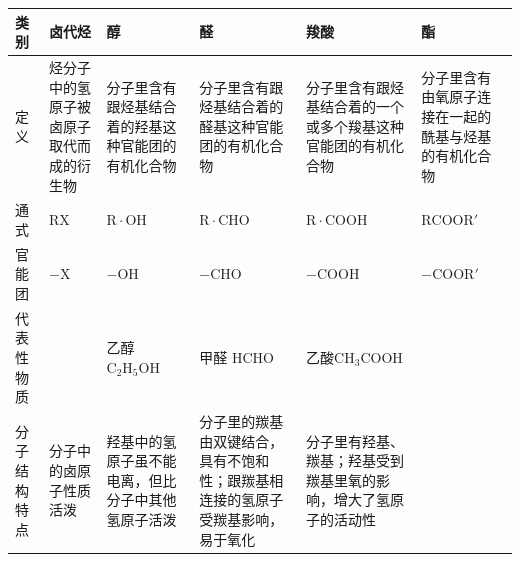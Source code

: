 {\def\LTcaptype{none}\footnotesize\setlength{\tabcolsep}{3pt}%
\begin{longtable}[]{@{}
  >{\raggedright\arraybackslash}p{}
  >{\raggedright\arraybackslash}p{}
  >{\raggedright\arraybackslash}p{}
  >{\raggedright\arraybackslash}p{}
  >{\raggedright\arraybackslash}p{}
  >{\raggedright\arraybackslash}p{}@{}}
\toprule\noalign{}
\begin{minipage}[b]{\linewidth}\raggedright
类别
\end{minipage} & \begin{minipage}[b]{\linewidth}\raggedright
卤代烃
\end{minipage} & \begin{minipage}[b]{\linewidth}\raggedright
醇
\end{minipage} & \begin{minipage}[b]{\linewidth}\raggedright
醛
\end{minipage} & \begin{minipage}[b]{\linewidth}\raggedright
羧酸
\end{minipage} & \begin{minipage}[b]{\linewidth}\raggedright
酯
\end{minipage} \\
\midrule\noalign{}
\endhead
\bottomrule\noalign{}
\endlastfoot
定义 & 烃分子中的氢原子被卤原子取代而成的衍生物 &
分子里含有跟烃基结合着的羟基这种官能团的有机化合物 &
分子里含有跟烃基结合着的醛基这种官能团的有机化合物 &
分子里含有跟烃基结合着的一个或多个羧基这种官能团的有机化合物 &
分子里含有由氧原子连接在一起的酰基与烃基的有机化合物 \\
通式 & \(\mathrm{RX}\) & \(\mathrm{R\cdot OH}\) &
\(\mathrm{R\cdot CHO}\) & \(\mathrm{R\cdot COOH}\) &
\(\mathrm{RCOOR'}\) \\
官能团 & \(\mathrm{-X}\) & \(\mathrm{-OH}\) & \(\mathrm{-CHO}\) &
\(\mathrm{-COOH}\) & \(\mathrm{-COOR'}\) \\
代表性物质 & & 乙醇 \(\mathrm{C_2H_5OH}\) & 甲醛 \(\mathrm{HCHO}\) &
乙酸\newline \(\mathrm{CH_3COOH}\) & \\
分子结构特点 & 分子中的卤原子性质活泼 &
羟基中的氢原子虽不能电离，但比分子中其他氢原子活泼 &
分子里的羰基由双键结合，具有不饱和性；跟羰基相连接的氢原子受羰基影响，易于氧化
& 分子里有羟基、羰基；羟基受到羰基里氧的影响，增大了氢原子的活动性 &

\end{longtable}}
